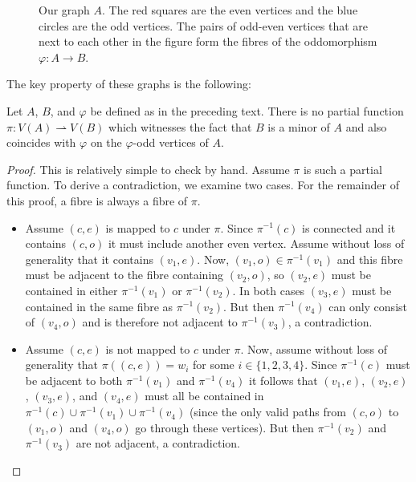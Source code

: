 \documentclass[11pt]{article}
\begin{document}
\begin{figure}[htbp]
    \centering
    
    \caption{Our graph $A$. The red squares are the even vertices and the blue circles are the odd vertices. The pairs of odd-even vertices that are next to each other in the figure form the fibres of the oddomorphism $\varphi:A \to B$.}
    \label{fig:F}
\end{figure}

The key property of these graphs is the following:
\begin{proposition}
    Let $A$, $B$, and $\varphi$ be defined as in the preceding text. There is no partial function $\pi: V(A) \rightharpoonup V(B)$ which witnesses the fact that $B$ is a minor of $A$ and also coincides with $\varphi$ on the $\varphi$-odd vertices of $A$.
\end{proposition}
\begin{proof}
    This is relatively simple to check by hand. Assume $\pi$ is such a partial function. To derive a contradiction, we examine two cases. For the remainder of this proof, a fibre is always a fibre of $\pi$.\begin{itemize}
        \item Assume $(c, e)$ is mapped to $c$ under $\pi$. Since $\pi^{-1}(c)$ is connected and it contains $(c,o)$ it must include another even vertex. Assume without loss of generality that it contains $(v_1, e)$.  
        Now, $(v_1,o) \in \pi^{-1}(v_1)$ and this fibre must be adjacent to the fibre containing $(v_2,o)$, so $(v_2,e)$ must be contained in either $\pi^{-1}(v_1)$ or $\pi^{-1}(v_2)$.
        In both cases $(v_3,e)$ must be contained in the same fibre as $\pi^{-1}(v_2)$.
        But then $\pi^{-1}(v_4)$ can only consist of $(v_4,o)$ and is therefore not adjacent to $\pi^{-1}(v_3)$, a contradiction.

        \item Assume $(c, e)$ is not mapped to $c$ under $\pi$.
        Now, assume without loss of generality that $\pi((c,e)) = w_i$ for some $i \in \{1,2,3,4\}$. Since $\pi^{-1}(c)$ must be adjacent to both $\pi^{-1}(v_1)$ and $\pi^{-1}(v_4)$ it follows that $(v_1,e)$, $(v_2,e)$, $(v_3,e)$, and $(v_4,e)$ must all be contained in $\pi^{-1}(c) \cup \pi^{-1}(v_1) \cup \pi^{-1}(v_4)$ (since the only valid paths from $(c,o)$ to $(v_1,o)$ and $(v_4,o)$ go through these vertices). But then $\pi^{-1}(v_2)$ and $\pi^{-1}(v_3)$ are not adjacent, a contradiction.
    \end{itemize}

    
\end{proof}
\end{document}
